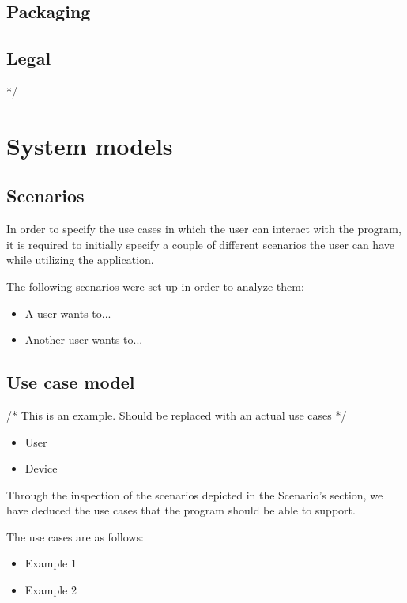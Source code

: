\subsection{Packaging}

\subsection{Legal}
*/

\section{System models}

\subsection{Scenarios}
In order to specify the use cases in which the user can interact with the program, it is required to initially specify a couple of different scenarios the user can have while utilizing the application.

The following scenarios were set up in order to analyze them:

\begin{itemize}
	\setlength{\itemsep}{-5pt}
	
	\item A user wants to...
	\item Another user wants to...
\end{itemize}

\subsection{Use case model}


/* This is an example. Should be replaced with an actual use cases */
\begin{itemize}
	\setlength{\itemsep}{-5pt}
	\item User
	\item Device
\end{itemize}

Through the inspection of the scenarios depicted in the Scenario’s section, we have deduced the use cases that the program should be able to support.

The use cases are as follows:

\begin{itemize}
	\setlength{\itemsep}{-5pt}
	
	\item Example 1
	\item Example 2
\end{itemize}


